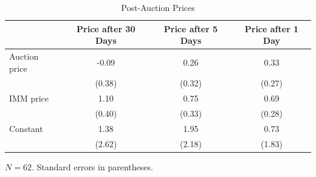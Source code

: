 \begin{table}[htbp]
\centering
\caption{Post-Auction Prices}
\label{tab:os3}
\begin{tabular}{lccc}
\hline\hline
 & Price after 30 Days & Price after 5 Days & Price after 1 Day \\
\hline
Auction price & -0.09 & 0.26 & 0.33 \\
 & (0.38) & (0.32) & (0.27) \\
IMM price & 1.10 & 0.75 & 0.69 \\
 & (0.40) & (0.33) & (0.28) \\
Constant & 1.38 & 1.95 & 0.73 \\
 & (2.62) & (2.18) & (1.83) \\
\hline\hline
\end{tabular}
\begin{tablenotes}\small\item $N = 62$. Standard errors in parentheses.\end{tablenotes}
\end{table}
